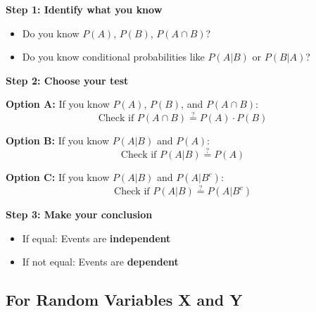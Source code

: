 \documentclass[11pt]{article}
\begin{document}
\begin{tcolorbox}[colback=yellow!10!white,colframe=orange!75!black,title=Step-by-Step Guide]
\textbf{Step 1: Identify what you know}
\begin{itemize}
    \item Do you know $P(A)$, $P(B)$, $P(A \cap B)$?
    \item Do you know conditional probabilities like $P(A|B)$ or $P(B|A)$?
\end{itemize}

\textbf{Step 2: Choose your test}

\textbf{Option A:} If you know $P(A)$, $P(B)$, and $P(A \cap B)$:
\begin{equation}
\text{Check if } P(A \cap B) \stackrel{?}{=} P(A) \cdot P(B)
\end{equation}

\textbf{Option B:} If you know $P(A|B)$ and $P(A)$:
\begin{equation}
\text{Check if } P(A|B) \stackrel{?}{=} P(A)
\end{equation}

\textbf{Option C:} If you know $P(A|B)$ and $P(A|B^c)$:
\begin{equation}
\text{Check if } P(A|B) \stackrel{?}{=} P(A|B^c)
\end{equation}

\textbf{Step 3: Make your conclusion}
\begin{itemize}
    \item If equal: Events are \textbf{independent}
    \item If not equal: Events are \textbf{dependent}
\end{itemize}
\end{tcolorbox}

\subsection{For Random Variables X and Y}
\end{document}
